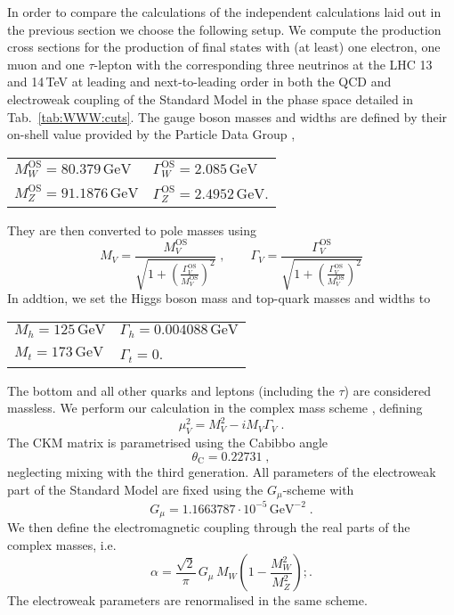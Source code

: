 In order to compare the calculations of the independent 
calculations laid out in the previous section we 
choose the following setup.
We compute the production cross sections for the production of 
final states with (at least) one electron, one muon and one 
$\tau$-lepton with the corresponding three neutrinos at the 
LHC 13 and 14\,TeV at leading and next-to-leading order 
in both the QCD and electroweak coupling of the Standard Model
in the phase space detailed in 
Tab.\ \ref{tab:WWW:cuts}. 
The gauge boson masses and widths are defined by their on-shell 
value provided by the Particle Data Group \cite{}, 
\begin{center}
  \begin{tabular}{ll}
    $M_W^\text{OS}=80.379\,\text{GeV}$\qquad & $\Gamma_W^\text{OS}=2.085\,\text{GeV}$ \\
    $M_Z^\text{OS}=91.1876\,\text{GeV}$\qquad & $\Gamma_Z^\text{OS}=2.4952\,\text{GeV}$.
  \end{tabular}
\end{center}
They are then converted to pole masses using 
\begin{equation}
  M_V=\frac{M_V^\text{OS}}{\sqrt{1+\left(\frac{\Gamma_V^\text{OS}}{M_V^\text{OS}}\right)^2}}\;,
  \qquad
  \Gamma_V=\frac{\Gamma_V^\text{OS}}{\sqrt{1+\left(\frac{\Gamma_V^\text{OS}}{M_V^\text{OS}}\right)^2}}
\end{equation}
In addtion, we set the Higgs boson mass and top-quark masses 
and widths to 
\begin{center}
  \begin{tabular}{ll}
    $M_h=125\,\text{GeV}$ & $\Gamma_h=0.004088\,\text{GeV}$ \\
    $M_t=173\,\text{GeV}$ & $\Gamma_t=0$\;. \\
  \end{tabular}
\end{center}
The bottom and all other quarks and leptons (including the $\tau$) 
are considered massless.
We perform our calculation in the complex mass scheme 
\cite{Denner:2005fg,Denner:2014zga},
defining
\begin{equation}
  \mu_V^2=M_V^2-iM_V\Gamma_V\;.
\end{equation}
The CKM matrix is parametrised using the Cabibbo angle 
\begin{equation}
  \theta_\text{C}=0.22731\;,\nonumber
\end{equation}
neglecting mixing with the third generation. 
All parameters of the electroweak part of the Standard Model 
are fixed using the $G_\mu$-scheme \cite{} with
\begin{equation}
  G_\mu=1.1663787\cdot 10^{-5}\,\text{GeV}^{-2}\;.\nonumber
\end{equation}
We then define the electromagnetic coupling through the 
real parts of the complex masses, i.e.\
\begin{equation}
  \alpha=\frac{\sqrt{2}}{\pi}\,G_\mu\,M_W\left(1-\frac{M_W^2}{M_Z^2}\right);.
\end{equation}
The electroweak parameters are renormalised in the same scheme.





